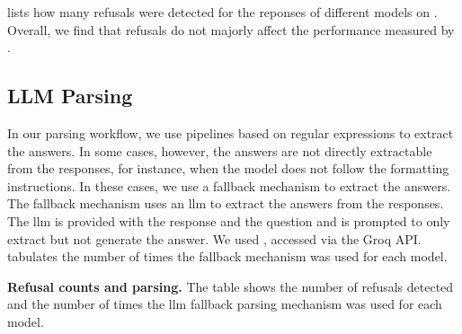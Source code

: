  lists how many refusals were detected for the reponses of different models on \chembench. Overall, we find that refusals do not majorly affect the performance measured by \chembench.


\subsection{LLM Parsing} \label{sec:llm-parsing}

In our parsing workflow, we use pipelines based on regular expressions to extract the answers. In some cases, however, the answers are not directly extractable from the responses, for instance, when the model does not follow the formatting instructions. In these cases, we use a fallback mechanism to extract the answers. The fallback mechanism uses an \gls{llm} to extract the answers from the responses. The \gls{llm} is provided with the response and the question and is prompted to only extract but not generate the answer. We used \LlamaThreeSeventyBInstruct, accessed via the Groq API.
 tabulates the number of times the fallback mechanism was used for each model.


\begin{table}
    \centering
    \caption{\textbf{Refusal counts and parsing.} The table shows the number of refusals detected and the number of times the \gls{llm} fallback parsing mechanism was used for each model.}
    \label{tab:refusal_counts_and_parsing}
\end{table}

\clearpage
